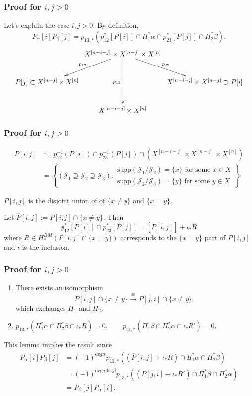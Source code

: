 \documentclass{beamer}
\begin{document}
\begin{frame}%
\frametitle{Proof for $i,j>0$}

Let's explain the case $i,j>0$.
By definition,
$$
P_\alpha[i]P_\beta[j]
=p_{13,*}(p_{12}^*[P[i]]\cap\Pi_1^*\alpha\cap p_{23}^*[P[j]]\cap\Pi_2^*\beta).
$$
$$
\xymatrixcolsep{.2em}
\xymatrix{
&  X^{[n-i-j]} \times X^{[n-j]} \times X^{[n]}
\ar[dl]_{p_{12}}\ar[dr]^{p_{23}}\ar[dd]_{p_{13}}\\
P[j]\subset X^{[n-j]}\times X^{[n]}& & X^{[n-i-j]}\times X^{[n-j]}\supset P[i]\\
& X^{[n-i-j]}\times X^{[n]}
}
$$
\end{frame}

\begin{frame}%
\frametitle{Proof for $i,j>0$}
\begin{align*}
P[i,j]&:=p_{12}^{-1}(P[i])\cap p_{23}^{-1}(P[j])
\cap(X^{[n-i-j]}\times X^{[n-j]}\times X^{[n]})\\
&=\left\{
(\mathcal{J}_1\supseteq\mathcal{J}_2\supseteq\mathcal{J}_3):
\substack{
\text{supp}(\mathcal{J}_1/\mathcal{J}_2)=\{x\}
\text{ for some }x\in X\\
\text{supp}(\mathcal{J}_2/\mathcal{J}_3)=\{y\}
\text{ for some }y \in X }\right\}
\end{align*}

\pause
$P[i,j]$ is the disjoint union of
of $\{x \neq y\}$ and $\{x=y\}$.

\medskip\noindent
Let $\overline{P}[i,j]:=\overline{P[i,j]\cap\{x\neq y\}}$.
Then
$$
p_{12}^* [P[i]]\cap p_{23}^* [P[j]]=[\overline{P}[i,j]]+\iota_*R
$$
where $R \in H_*^{BM}(P[i,j]\cap \{x=y\})$ corresponds
to the $\{x=y\}$ part of $P[i,j]$ 
and $\iota$ is the inclusion.
\end{frame}

\begin{frame}%
\frametitle{Proof for $i,j>0$}
\begin{lemma}
\label{lemma-pij}
\begin{enumerate}
\item There exists an isomorphism
$$
P[i,j]\cap\{x \neq y\}\xrightarrow{\cong}P[j,i]\cap \{x \neq y\},
$$
\noindent
which exchanges $\Pi_1$ and $\Pi_2$.

\item $
p_{13,*}(\Pi_1^*\alpha\cap\Pi_2^*\beta\cap\iota_*R)=0,\qquad 
p_{13,*}(\Pi_1\beta\cap\Pi_2^*\alpha\cap\iota_*R')=0.
$
\end{enumerate}
\end{lemma}

\medskip\noindent\pause
\noindent
This lemma implies the result since
\begin{align*}
P_\alpha[i]P_\beta[j]
&=(-1)^{\text{deg}\alpha}p_{13,*}((\overline{P}[i,j]+\iota_*R)\cap\Pi_1^*\alpha\cap\Pi_2^*\beta)\\
&=(-1)^{\text{deg}\alpha\text{deg}\beta}
p_{13,*}((\overline{P}[j,i]+\iota_*R')\cap\Pi_1^*\beta\cap\Pi_2^*\alpha)\\
&=P_\beta[j]P_\alpha[i].
\end{align*}
\end{frame}
\end{document}
